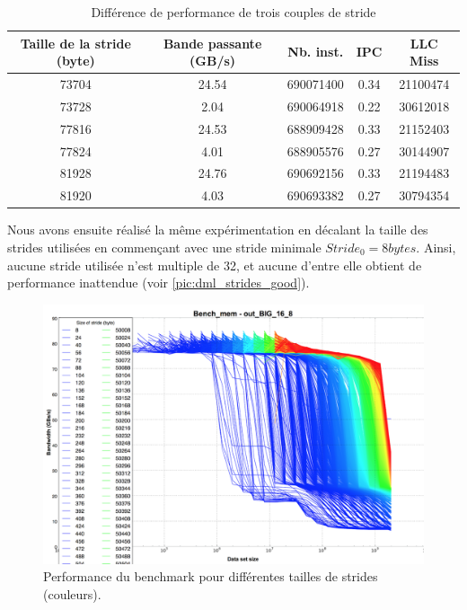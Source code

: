         \begin{table}[]
        \centering
        \begin{tabular}{|c|c|c|c|c|}
        \hline
        \rowcolor[HTML]{EFEFEF} 
        Taille de la stride (byte) & Bande passante (GB/s) & Nb. inst. & IPC & LLC Miss \\ \hline
        \rowcolor[HTML]{FFFFC7} 
        73704 & 24.54 & 690071400 & 0.34 & 21100474 \\ \hline
        \rowcolor[HTML]{FFFFC7} 
        73728 & 2.04 & 690064918 & 0.22 & 30612018 \\ \hline
        \rowcolor[HTML]{E8FFFE} 
        77816 & 24.53 & 688909428 & 0.33 & 21152403 \\ \hline
        \rowcolor[HTML]{E8FFFE} 
        77824 & 4.01 & 688905576 & 0.27 & 30144907 \\ \hline
        \rowcolor[HTML]{E6FFE6} 
        81928 & 24.76 & 690692156 & 0.33 & 21194483 \\ \hline
        \rowcolor[HTML]{E6FFE6} 
        81920 & 4.03 & 690693382 & 0.27 & 30794354 \\ \hline
        \end{tabular}%
        \caption{Différence de performance de trois couples de stride}
        \label{tab:dml_bad_strides}
        \end{table}
        
        
        Nous avons ensuite réalisé la même expérimentation en décalant la taille des strides utilisées en commençant avec une stride minimale $Stride_0 =  8 bytes$. Ainsi, aucune stride utilisée n'est multiple de 32, et aucune d'entre elle obtient de performance inattendue (voir \autoref{pic:dml_strides_good}).
        
        
        \begin{figure}
        \center
        \includegraphics[width=12cm]{images/dml_strides.png}
        \caption{\label{pic:dml_strides_good} Performance du benchmark pour différentes tailles de strides (couleurs).  }
        \end{figure}
        
